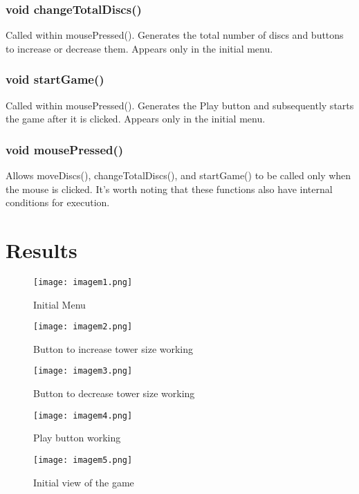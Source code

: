 \documentclass[
	12pt,				%
	oneside,			%
	a4paper,			%
	english,			%
	brazil,				%
	]{abntex2}
\begin{document}
{\subsubsection{void changeTotalDiscs()}
Called within mousePressed(). Generates the total number of discs and buttons to increase or decrease them. Appears only in the initial menu.

\subsubsection{void startGame()}
Called within mousePressed(). Generates the Play button and subsequently starts the game after it is clicked. Appears only in the initial menu.

\subsubsection{void mousePressed()}
Allows moveDiscs(), changeTotalDiscs(), and startGame() to be called only when the mouse is clicked. It's worth noting that these functions also have internal conditions for execution.

\section{Results}

\begin{figure}[H]
  \centering
  \texttt{[image: imagem1.png]}
  \caption{Initial Menu}
\end{figure}

\begin{figure}[H]
  \centering
  \texttt{[image: imagem2.png]}
  \caption{Button to increase tower size working}
\end{figure}

\begin{figure}[H]
  \centering
  \texttt{[image: imagem3.png]}
  \caption{Button to decrease tower size working}
\end{figure}

\begin{figure}[H]
  \centering
  \texttt{[image: imagem4.png]}
  \caption{Play button working}
\end{figure}

\begin{figure}[H]
  \centering
  \texttt{[image: imagem5.png]}
  \caption{Initial view of the game}
\end{figure}

}
\end{document}
